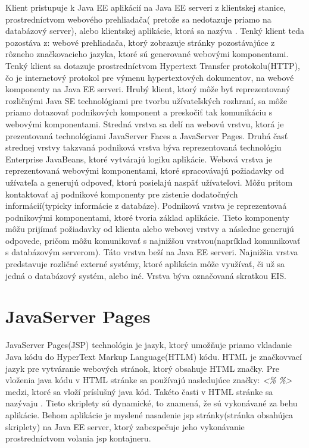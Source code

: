 Klient pristupuje k Java EE aplikácií na Java EE serveri z klientskej stanice, prostredníctvom webového prehliadača( pretože sa nedotazuje priamo na databázový server), alebo klientskej aplikácie, ktorá sa nazýva . Tenký klient teda pozostáva z: webové prehliadača, ktorý zobrazuje stránky pozostávajúce z rôzneho značkovacieho jazyka, ktoré sú generované webovými komponentami. Tenký klient sa dotazuje prostredníctvom Hypertext Transfer protokolu(HTTP), čo je internetový protokol pre výmenu hypertextových dokumentov, na webové komponenty na Java EE serveri. Hrubý klient, ktorý môže byť reprezentovaný rozličnými Java SE technológiami pre tvorbu užívateľských rozhraní, sa môže priamo dotazovať podnikových komponent a preskočiť tak komunikáciu s webovými komponentami. \newline \indent Stredná vrstva sa delí na webovú vrstvu, ktorá je prezentovaná technológiami JavaServer Faces a JavaServer Pages. Druhá časť strednej vrstvy takzvaná podniková vrstva býva reprezentovaná technológiu Enterprise JavaBeans, ktoré vytvárajú logiku aplikácie. Webová vrstva je reprezentovaná webovými komponentami, ktoré spracovávajú požiadavky od užívateľa a generujú odpoveď, ktorú posielajú naspäť užívateľovi. Môžu pritom kontaktovať aj podnikové komponenty pre zistenie dodatočných informácií(typicky informácie z databáze). Podniková vrstva je reprezentovaá podnikovými komponentami, ktoré tvoria základ aplikácie. Tieto komponenty môžu prijímať požiadavky od klienta alebo webovej vrstvy a následne generujú odpovede, pričom môžu komunikovať s najnižšou vrstvou(napríklad komunikovať s databázovým serverom). Táto vrstva beží na Java EE serveri. \newline \indent Najnižšia vrstva predstavuje rozličné externé systémy, ktoré aplikácia môže využívať, či už sa jedná o databázový systém, alebo iné. Vrstva býva označovaná skratkou EIS.



\section{JavaServer Pages}\label{jspkap}
JavaServer Pages(JSP) technológia je jazyk, ktorý umožňuje priamo vkladanie Java kódu do HyperText Markup Language(HTLM) kódu. HTML je značkovvací jazyk pre vytváranie webových stránok, ktorý obsahuje HTML značky. Pre vloženia java kódu v HTML stránke sa používajú nasledujúce značky: \emph{<\%} \emph{\%>} medzi, ktoré sa vloží príslušný java kód. Takéto časti v HTML stránke sa nazývaju . Tieto skriplety sú dynamické, to znamená, že sú vykonávané za behu aplikácie. Behom aplikácie je myslené nasadenie jsp stránky(stránka obsahújca skriplety) na Java EE server, ktorý zabezpečuje jeho vykonávanie prostredníctvom volania jsp kontajneru.

